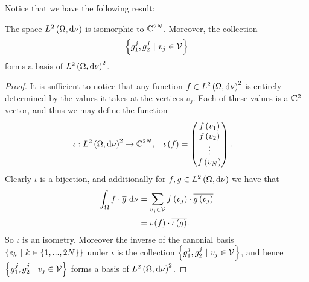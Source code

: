 \documentclass[11pt]{report}
\begin{document}
Notice that we have the following result:
\begin{lemma}
	The space $L^{2}\left( \Omega,\mathrm{d}\nu \right)$ is isomorphic to $\mathbb{C}^{2N}$.
	Moreover, the collection 
	\begin{align*}
		\left\{ g_1^j, g_2^j \ \vert \ v_j\in\mathcal{V} \right\}
	\end{align*}
	forms a basis of $L^{2}\left( \Omega,\mathrm{d}\nu \right)^2$.
\end{lemma}
\begin{proof}
	It is sufficient to notice that any function $f\in L^{2}\left( \Omega,\mathrm{d}\nu \right)^2$ is entirely determined by the values it takes at the vertices $v_j$.
	Each of these values is a $\mathbb{C}^2$-vector, and thus we may define the function
	\begin{align*}
		\iota:L^{2}\left( \Omega,\mathrm{d}\nu \right)^2 \rightarrow\mathbb{C}^{2N}, &\quad
		\iota\left( f \right) = \begin{pmatrix} f\left( v_1 \right) \\ f\left( v_2 \right) \\ \vdots \\ f\left( v_N \right) \end{pmatrix}.
	\end{align*}
	Clearly $\iota$ is a bijection, and additionally for $f,g\in L^{2}\left( \Omega,\mathrm{d}\nu \right)$ we have that
	\begin{align*}
		\int_{\Omega}f\cdot \overline{g} \ \mathrm{d}\nu &= \sum_{v_j\in\mathcal{V}} f\left( v_j \right)\cdot\overline{g\left( v_j \right)} \\
		&= \iota\left( f \right)\cdot\overline{\iota\left( g \right)}.
	\end{align*}
	So $\iota$ is an isometry.
	Moreover the inverse of the canonial basis $\clbracs{e_k \ \vert \ k\in\clbracs{1,...,2N}}$ under $\iota$ is the collection $\clbracs{g_1^j, g_2^j \ \vert \ v_j\in\vertSet}$, and hence $\clbracs{g_1^j, g_2^j \ \vert \ v_j\in\vertSet}$ forms a basis of $L^{2}\left( \Omega,\mathrm{d}\nu \right)^2$.
\end{proof}
\end{document}
